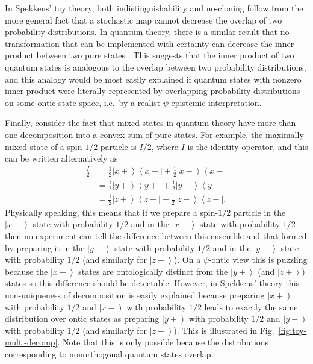 \documentclass[DIV=calc,paper=a4,fontsize=11pt,twocolumn]{scrartcl} %
\theoremstyle{definition}
\theoremstyle{plain}
\newcommand{\RKet}[1]{\ensuremath{\left \vert #1 \right )}}
\newcommand{\Ket}[1]{\ensuremath{\left \vert #1 \right \rangle}}
\newcommand{\Bra}[1]{\ensuremath{\left \langle #1 \right \vert}}
\begin{document}
In Spekkens' toy theory, both indistinguishability and no-cloning
follow from the more general fact that a stochastic map cannot
decrease the overlap of two probability distributions. In quantum
theory, there is a similar result that no transformation that can be
implemented with certainty can decrease the inner product between two
pure states \cite{Chefles1998}.  This suggests that the inner product
of two quantum states is analogous to the overlap between two
probability distributions, and this analogy would be most easily
explained if quantum states with nonzero inner product were literally
represented by overlapping probability distributions on some ontic
state space, i.e.\ by a realist $\psi$-epistemic interpretation.

Finally, consider the fact that mixed states in quantum theory have
more than one decomposition into a convex sum of pure states.  For
example, the maximally mixed state of a spin-$1/2$ particle is $I/2$,
where $I$ is the identity operator, and this can be written
alternatively as
\begin{align}
\frac{I}{2} & = \frac{1}{2} \Ket{x+}\Bra{x+} + \frac{1}{2}
\Ket{x-}\Bra{x-} \\
& = \frac{1}{2} \Ket{y+}\Bra{y+} + \frac{1}{2} \Ket{y-}\Bra{y-} \\
& = \frac{1}{2} \Ket{z+}\Bra{z+} + \frac{1}{2} \Ket{z-}\Bra{z-}.
\end{align}
Physically speaking, this means that if we prepare a spin-$1/2$
particle in the $\Ket{x+}$ state with probability $1/2$ and in the
$\Ket{x-}$ state with probability $1/2$ then no experiment can tell
the difference between this ensemble and that formed by preparing it
in the $\Ket{y+}$ state with probability $1/2$ and in the $\Ket{y-}$
state with probability $1/2$ (and similarly for $\Ket{z \pm}$).  On a
$\psi$-ontic view this is puzzling because the $\Ket{x \pm}$ states
are ontologically distinct from the $\Ket{y \pm}$ (and $\Ket{z \pm}$)
states so this difference should be detectable.  However, in Spekkens'
theory this non-uniqueness of decomposition is easily explained because
preparing $\RKet{x+}$ with probability $1/2$ and $\RKet{x-}$ with
probability $1/2$ leads to exactly the same distribution over ontic
states as preparing $\RKet{y+}$ with probability $1/2$ and $\RKet{y-}$
with probability $1/2$ (and similarly for $\RKet{z \pm}$).  This is
illustrated in Fig.~\ref{fig:toy-multi-decomp}.  Note that this is
only possible because the distributions corresponding to nonorthogonal
quantum states overlap.
\end{document}
